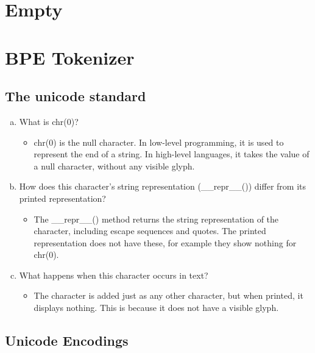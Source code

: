 \documentclass{article}
\begin{document}
\section{Empty}

\section{BPE Tokenizer}

\subsection{The unicode standard}

\begin{enumerate}[a)]
  \item What is chr(0)?
  \begin{itemize}
    \item chr(0) is the null character. In low-level programming, it is used to represent the end of a string. In high-level languages, it takes the value of a null character, without any visible glyph.
  \end{itemize}

  \item How does this character’s string representation (__repr__()) differ from its printed representation?
  \begin{itemize}
    \item The __repr__() method returns the string representation of the character, including escape sequences and quotes. The printed representation does not have these, for example they show nothing for chr(0).
  \end{itemize}

  \item What happens when this character occurs in text?
  \begin{itemize}
    \item The character is added just as any other character, but when printed, it displays nothing. This is because it does not have a visible glyph.
  \end{itemize}
\end{enumerate}

\subsection{Unicode Encodings}
\end{document}
